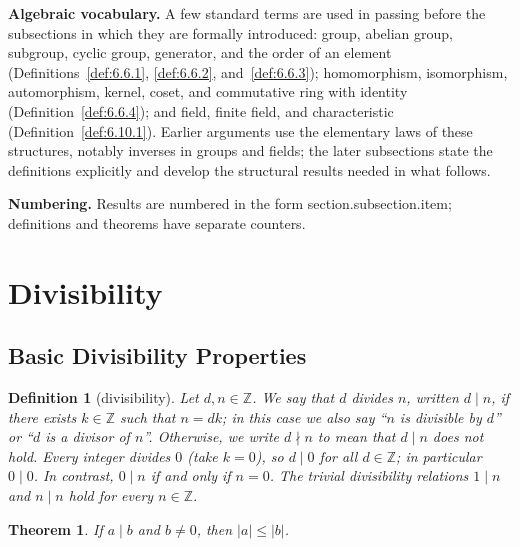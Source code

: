 \documentclass[11pt]{article}
\theoremstyle{ntstyle}
\newtheorem{theorem}{Theorem}[subsection]
\newtheorem{definition}{Definition}[subsection]
\begin{document}
\noindent \textbf{Algebraic vocabulary.} A few standard terms are used in passing before the subsections in which they are formally introduced: group, abelian group, subgroup, cyclic group, generator, and the order of an element (Definitions~\ref{def:6.6.1}, \ref{def:6.6.2}, and~\ref{def:6.6.3}); homomorphism, isomorphism, automorphism, kernel, coset, and commutative ring with identity (Definition~\ref{def:6.6.4}); and field, finite field, and characteristic (Definition~\ref{def:6.10.1}). Earlier arguments use the elementary laws of these structures, notably inverses in groups and fields; the later subsections state the definitions explicitly and develop the structural results needed in what follows.

\noindent \textbf{Numbering.} Results are numbered in the form section.subsection.item; definitions and theorems have separate counters.

\newpage

\section{Divisibility}

\subsection{Basic Divisibility Properties}

\begin{definition}[divisibility]\label{def:1.1.1} Let $d, n \in
		\mathbb{Z}$. We say that $d$ divides $n$, written $d \mid n$, if there
	exists $k \in \mathbb{Z}$ such that $n = dk$; in this case we also
	say ``$n$ is divisible by $d$'' or ``$d$ is a
	divisor of $n$''. Otherwise, we write $d \nmid n$ to mean that $d \mid n$ does not hold. Every integer divides $0$ (take $k
		= 0$), so $d \mid 0$ for all $d \in \mathbb{Z}$; in particular $0
		\mid 0$. In contrast, $0 \mid n$ if and only if $n = 0$. The trivial
	divisibility relations $1 \mid n$ and $n \mid n$ hold for every $n \in \mathbb{Z}$.

\end{definition}
\begin{theorem}\label{thm:1.1.1} If $a \mid b$ and $b
		\neq 0$, then $|a| \le |b|$.

\end{theorem}
\end{document}
